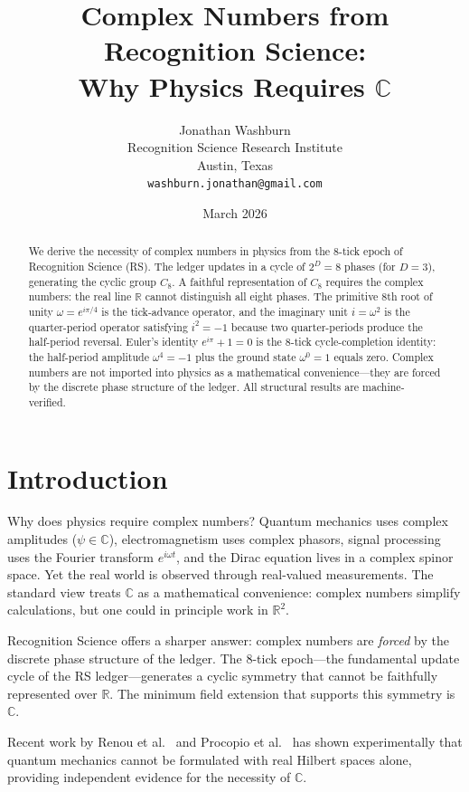 \documentclass[12pt,a4paper]{article}
\title{Complex Numbers from Recognition Science:\\
Why Physics Requires $\mathbb{C}$}
\author{Jonathan Washburn\\
Recognition Science Research Institute\\
Austin, Texas\\
\texttt{washburn.jonathan@gmail.com}}
\date{March 2026}
\theoremstyle{definition}
\theoremstyle{remark}
\begin{document}
\maketitle

\begin{abstract}
We derive the necessity of complex numbers in physics from the
8-tick epoch of Recognition Science (RS).  The ledger updates in
a cycle of $2^D = 8$ phases (for $D = 3$), generating the cyclic
group $C_8$.  A faithful representation of $C_8$ requires the
complex numbers: the real line $\mathbb{R}$ cannot distinguish
all eight phases.  The primitive 8th root of unity
$\omega = e^{i\pi/4}$ is the tick-advance operator, and the
imaginary unit $i = \omega^2$ is the quarter-period operator
satisfying $i^2 = -1$ because two quarter-periods produce the
half-period reversal.  Euler's identity $e^{i\pi} + 1 = 0$ is
the 8-tick cycle-completion identity: the half-period amplitude
$\omega^4 = -1$ plus the ground state $\omega^0 = 1$ equals
zero.  Complex numbers are not imported into physics as a
mathematical convenience---they are forced by the discrete
phase structure of the ledger.  All structural results are
machine-verified.
\end{abstract}

\section{Introduction}
\label{sec:intro}

Why does physics require complex numbers?  Quantum mechanics
uses complex amplitudes ($\psi \in \mathbb{C}$),
electromagnetism uses complex phasors, signal processing uses
the Fourier transform $e^{i\omega t}$, and the Dirac equation
lives in a complex spinor space.  Yet the real world is
observed through real-valued measurements.  The standard view
treats $\mathbb{C}$ as a mathematical convenience: complex
numbers simplify calculations, but one could in principle work
in $\mathbb{R}^2$.

Recognition Science offers a sharper answer: complex numbers
are \emph{forced} by the discrete phase structure of the
ledger.  The 8-tick epoch---the fundamental update cycle of
the RS ledger---generates a cyclic symmetry that cannot be
faithfully represented over $\mathbb{R}$.  The minimum field
extension that supports this symmetry is $\mathbb{C}$.

Recent work by Renou et al.~\cite{Renou2021} and
Procopio et al.~\cite{Procopio2022} has shown experimentally
that quantum mechanics cannot be formulated with real Hilbert
spaces alone, providing independent evidence for the necessity
of $\mathbb{C}$.
\end{document}
